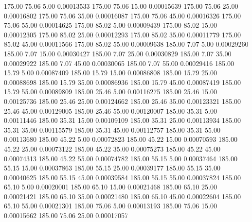     175.00     75.06      5.00     0.00013533
    175.00     75.06     15.00     0.00015639
    175.00     75.06     25.00     0.00016802
    175.00     75.06     35.00     0.00016087
    175.00     75.06     45.00     0.00016326
    175.00     75.06     55.00     0.00014625
    175.00     85.02      5.00     0.00009439
    175.00     85.02     15.00     0.00012305
    175.00     85.02     25.00     0.00012293
    175.00     85.02     35.00     0.00011779
    175.00     85.02     45.00     0.00011566
    175.00     85.02     55.00     0.00009638
    185.00      7.07      5.00     0.00029260
    185.00      7.07     15.00     0.00030427
    185.00      7.07     25.00     0.00030829
    185.00      7.07     35.00     0.00029922
    185.00      7.07     45.00     0.00030065
    185.00      7.07     55.00     0.00029416
    185.00     15.79      5.00     0.00087409
    185.00     15.79     15.00     0.00086808
    185.00     15.79     25.00     0.00088698
    185.00     15.79     35.00     0.00086936
    185.00     15.79     45.00     0.00087419
    185.00     15.79     55.00     0.00089809
    185.00     25.46      5.00     0.00116275
    185.00     25.46     15.00     0.00125736
    185.00     25.46     25.00     0.00124662
    185.00     25.46     35.00     0.00123321
    185.00     25.46     45.00     0.00129005
    185.00     25.46     55.00     0.00120007
    185.00     35.31      5.00     0.00111446
    185.00     35.31     15.00     0.00109109
    185.00     35.31     25.00     0.00113934
    185.00     35.31     35.00     0.00115579
    185.00     35.31     45.00     0.00112757
    185.00     35.31     55.00     0.00113680
    185.00     45.22      5.00     0.00072823
    185.00     45.22     15.00     0.00070593
    185.00     45.22     25.00     0.00073122
    185.00     45.22     35.00     0.00075273
    185.00     45.22     45.00     0.00074313
    185.00     45.22     55.00     0.00074782
    185.00     55.15      5.00     0.00037464
    185.00     55.15     15.00     0.00037863
    185.00     55.15     25.00     0.00039177
    185.00     55.15     35.00     0.00040625
    185.00     55.15     45.00     0.00039584
    185.00     55.15     55.00     0.00037824
    185.00     65.10      5.00     0.00020001
    185.00     65.10     15.00     0.00021468
    185.00     65.10     25.00     0.00021421
    185.00     65.10     35.00     0.00021480
    185.00     65.10     45.00     0.00022604
    185.00     65.10     55.00     0.00021301
    185.00     75.06      5.00     0.00013193
    185.00     75.06     15.00     0.00015662
    185.00     75.06     25.00     0.00017057

